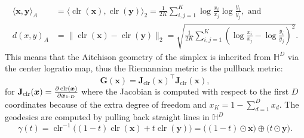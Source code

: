 \begin{align*}
\langle \boldsymbol{x}, \boldsymbol{y} \rangle_A &= 
\langle \operatorname{clr}(\boldsymbol{x}), \operatorname{clr}(\boldsymbol{y}) \rangle_2 
=\frac{1}{2K} \sum_{i,j=1}^{K} 
\log\frac{x_i}{x_j}\log\frac{y_i}{y_j}, \text{ and} \\
d(x,y)_A &= 
\| \operatorname{clr}(\boldsymbol{x})- \operatorname{clr}(\boldsymbol{y}) \|_2 
 = \sqrt{\frac{1}{2K}\sum_{i,j=1}^K
\left(\log\frac{x_i}{x_j}-\log\frac{y_i}{y_j}\right)^2 }.
\end{align*}
This means that the Aitchison geometry of the simplex is inherited from $\mathbb{H}^{D}$ via the center logratio map, thus the Riemannian metric is the pullback metric:
\begin{equation*}
    \mathbf{G}(\boldsymbol{x}) = \mathbf{J}_{\mathrm{clr}}(\boldsymbol{x})^\top\mathbf{J}_{\mathrm{clr}}(\boldsymbol{x}),
\end{equation*}
for $\mathbf{J}_{\mathrm{clr}}(\boldsymbol{x}) = \pdv{\operatorname{clr}(\boldsymbol{x})}{\boldsymbol{x}_{1:D}}$ where the Jacobian is computed with respect to the first $D$ coordinates because of the extra degree of freedom and $x_K =1- \sum_{d=1}^Dx_d$. The geodesics are computed by pulling back straight lines in $\mathbb{H}^D$
\begin{equation*}
    \gamma(t) = \operatorname{clr}^{-1}\bigl((1-t)\operatorname{clr}(\boldsymbol{x}) + t\operatorname{clr}(\boldsymbol{y})\bigr) = 
    \bigl((1-t)\odot \boldsymbol{x}\bigr) \oplus \bigl(t\odot \boldsymbol{y}\bigr).
\end{equation*}


